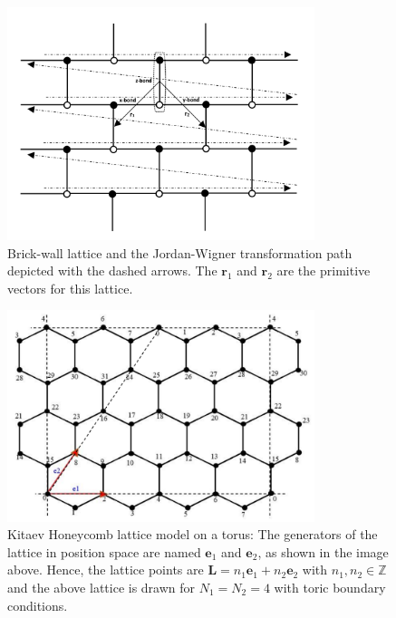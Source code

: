 \documentclass{article}
\begin{document}
\begin{figure}[h!]
	\centering
	\includegraphics[width=0.8\textwidth]{./images/Jor-Wig}
	\caption{\label{jor} Brick-wall lattice and the Jordan-Wigner transformation path depicted with the dashed arrows. The $\textbf{r}_1$ and $\textbf{r}_2$ are the primitive vectors for this lattice.} 
	\label{fig:fig01}
\end{figure}

\begin{figure}[h!]
	\centering
	\includegraphics[width=0.8\textwidth]{./images/diag_1.png}
	\caption{\label{kit_torus} Kitaev Honeycomb lattice model on a torus: The generators of the lattice in position space are named
	$\textbf{e}_{1}$ and  $\textbf{e}_{2}$, as shown in the image above. Hence, the lattice points are $\textbf{L} = n_{1}\textbf{e}_{1} + 
	n_{2}\textbf{e}_{2}$ with $n_{1}, n_{2} \in \mathbb{Z}$ and the above lattice is drawn for $N_{1} = N_{2} = 4 $ with toric boundary conditions.} 
	\label{fig:fig1}
\end{figure}
\end{document}
